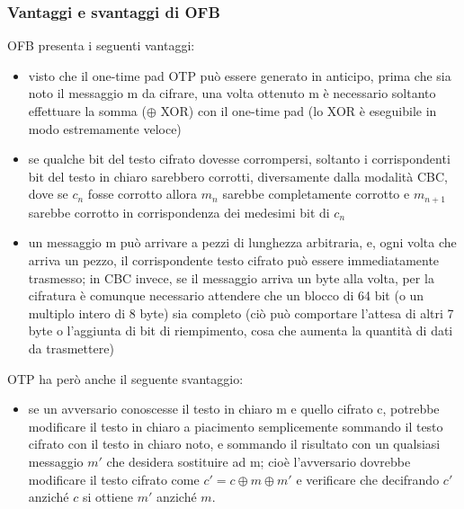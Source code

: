 \subsubsection{Vantaggi e svantaggi di OFB}
OFB presenta i seguenti vantaggi:
\begin{itemize}
\item visto che il one-time pad OTP può essere generato in anticipo, prima che sia noto il messaggio m da cifrare, una volta ottenuto m è necessario soltanto effettuare la somma ($\oplus$ XOR) con il one-time pad (lo XOR è eseguibile in modo estremamente veloce)
\item se qualche bit del testo cifrato dovesse corrompersi, soltanto i corrispondenti bit del testo in chiaro sarebbero corrotti, diversamente dalla modalità CBC, dove se $c_{n}$ fosse corrotto allora $m_{n}$ sarebbe completamente corrotto e $m_{n+1}$ sarebbe corrotto in corrispondenza dei medesimi bit di $c_{n}$
\item un messaggio m può arrivare a pezzi di lunghezza arbitraria, e, ogni volta che arriva un pezzo, il corrispondente testo cifrato può essere immediatamente trasmesso; in CBC invece, se il messaggio arriva un byte alla volta, per la cifratura è comunque necessario attendere che un blocco di 64 bit (o un multiplo intero di 8 byte) sia completo (ciò può comportare l'attesa di altri 7 byte o l'aggiunta di bit di riempimento, cosa che aumenta la quantità di dati da trasmettere)
\end{itemize}
OTP ha però anche il seguente svantaggio:
\begin{itemize}
\item se un avversario conoscesse il testo in chiaro m e quello cifrato c, potrebbe modificare il testo in
chiaro a piacimento semplicemente sommando il testo cifrato con il testo in chiaro noto, e sommando il risultato con un qualsiasi messaggio $m'$ che desidera sostituire ad m; cioè l'avversario dovrebbe modificare il testo cifrato come $c' = c \oplus m \oplus m'$ e verificare che decifrando $c'$ anziché $c$ si ottiene $m'$ anziché $m$.
\end{itemize}
